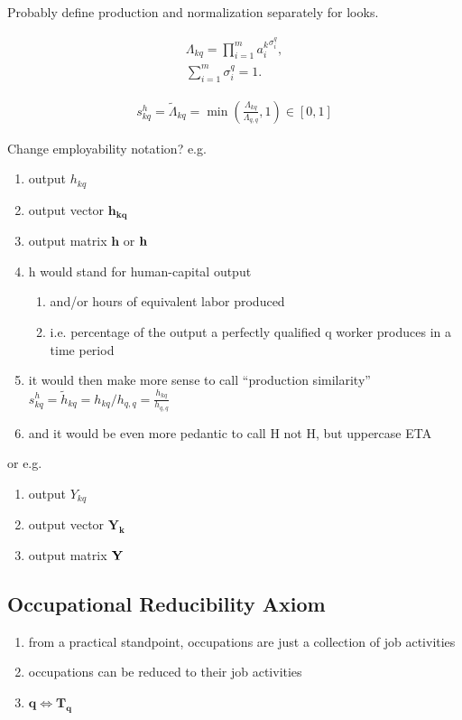 \documentclass{elsarticle} %
\begin{document}
Probably define production and normalization separately for looks.

\begin{gather*}
    \Lambda_{kq} = 
        \prod_{i=1}^{m}{
        {a_{i}^{k}} ^ {
            \sigma_{i}^{q}
        }
    }
    ,\\
    \sum_{i=1}^{m}{
        \sigma_{i}^{q}
    } = 1
    .
\end{gather*}

\begin{gather*}
    s_{kq}^{h} = 
    \tilde{\Lambda}_{kq} = 
    \min\left(
        \frac{\Lambda_{kq}}{\Lambda_{q,q}},
        1
    \right)
    \in [0,1]
\end{gather*}

Change employability notation?
e.g.
\begin{enumerate}
    \item output $h_{kq}$
    \item output vector $\boldsymbol{h_{kq}}$
    \item output matrix $\boldsymbol{h}$ or $\vb{h}$
    \item h would stand for human-capital output
    \begin{enumerate}
        \item and/or hours of equivalent labor produced
        \item i.e. percentage of the output a perfectly qualified q worker produces in a time period
    \end{enumerate}
    \item it would then make more sense to call ``production similarity'' $s_{kq}^{h} = \tilde{h}_{kq} = h_{kq} / h_{q,q} = 
    \frac{h_{kq}}{h_{q,q}}$
    \item and it would be even more pedantic to call H not H, but uppercase ETA
\end{enumerate}

or e.g.
\begin{enumerate}
    \item output $Y_{kq}$
    \item output vector $\boldsymbol{Y_{k}}$
    \item output matrix $\vb{Y}$
\end{enumerate}

\subsection{Occupational Reducibility Axiom}
\begin{enumerate}
    \item from a practical standpoint, occupations are just a collection of job
          activities
    \item occupations can be reduced to their job activities
    \item $\boldsymbol{q} \iff \boldsymbol{T_q}$
\end{enumerate}
\end{document}
